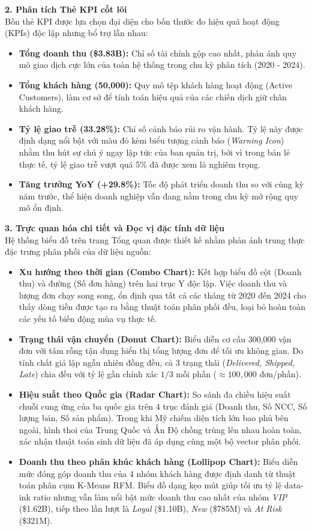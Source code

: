 \textbf{2. Phân tích Thẻ KPI cốt lõi} \\
Bốn thẻ KPI được lựa chọn đại diện cho bốn thước đo hiệu quả hoạt động (KPIs) độc lập nhưng bổ trợ lẫn nhau:
\begin{itemize}
    \item \textbf{Tổng doanh thu (\$3.83B):} Chỉ số tài chính gộp cao nhất, phản ánh quy mô giao dịch cực lớn của toàn hệ thống trong chu kỳ phân tích (2020 - 2024).
    \item \textbf{Tổng khách hàng (50,000):} Quy mô tệp khách hàng hoạt động (Active Customers), làm cơ sở để tính toán hiệu quả của các chiến dịch giữ chân khách hàng.
    \item \textbf{Tỷ lệ giao trễ (33.28\%):} Chỉ số cảnh báo rủi ro vận hành. Tỷ lệ này được định dạng nổi bật với màu đỏ kèm biểu tượng cảnh báo (\textit{Warning Icon}) nhằm thu hút sự chú ý ngay lập tức của ban quản trị, bởi vì trong bán lẻ thực tế, tỷ lệ giao trễ vượt quá 5\% đã được xem là nghiêm trọng.
    \item \textbf{Tăng trưởng YoY (+29.8\%):} Tốc độ phát triển doanh thu so với cùng kỳ năm trước, thể hiện doanh nghiệp vẫn đang nằm trong chu kỳ mở rộng quy mô ổn định.
\end{itemize}

\textbf{3. Trực quan hóa chi tiết và Đọc vị đặc tính dữ liệu} \\
Hệ thống biểu đồ trên trang Tổng quan được thiết kế nhằm phản ánh trung thực đặc trưng phân phối của dữ liệu nguồn:
\begin{itemize}
    \item \textbf{Xu hướng theo thời gian (Combo Chart):} Kết hợp biểu đồ cột (Doanh thu) và đường (Số đơn hàng) trên hai trục Y độc lập. Việc doanh thu và lượng đơn chạy song song, ổn định qua tất cả các tháng từ 2020 đến 2024 cho thấy dòng tiền được tạo ra bằng thuật toán phân phối đều, loại bỏ hoàn toàn các yếu tố biến động mùa vụ thực tế.
    \item \textbf{Trạng thái vận chuyển (Donut Chart):} Biểu diễn cơ cấu 300,000 vận đơn với tâm rỗng tận dụng hiển thị tổng lượng đơn để tối ưu không gian. Do tính chất giả lập ngẫu nhiên đồng đều, cả 3 trạng thái (\textit{Delivered, Shipped, Late}) chia đều với tỷ lệ gần chính xác $1/3$ mỗi phần ($\approx 100,000$ đơn/phần).
    \item \textbf{Hiệu suất theo Quốc gia (Radar Chart):} So sánh đa chiều hiệu suất chuỗi cung ứng của ba quốc gia trên 4 trục đánh giá (Doanh thu, Số NCC, Số lượng bán, Số sản phẩm). Trong khi Mỹ chiếm diện tích lớn bao phủ bên ngoài, hình thoi của Trung Quốc và Ấn Độ chồng trùng lên nhau hoàn toàn, xác nhận thuật toán sinh dữ liệu đã áp dụng cùng một bộ vector phân phối.
    \item \textbf{Doanh thu theo phân khúc khách hàng (Lollipop Chart):} Biểu diễn mức đóng góp doanh thu của 4 nhóm khách hàng được định danh từ thuật toán phân cụm K-Means RFM. Biểu đồ dạng kẹo mút giúp tối ưu tỷ lệ data-ink ratio \cite{tufte2001} nhưng vẫn làm nổi bật mức doanh thu cao nhất của nhóm \textit{VIP} (\$1.62B), tiếp theo lần lượt là \textit{Loyal} (\$1.10B), \textit{New} (\$785M) và \textit{At Risk} (\$321M).
\end{itemize}

